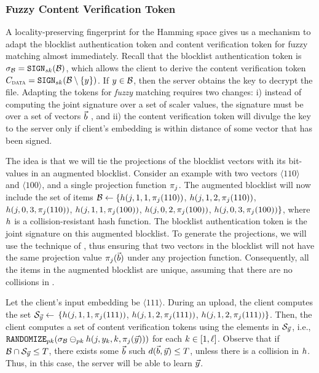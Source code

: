 \subsubsection{Fuzzy Content Verification Token}
\label{sec:fm:no_pre}
%
A locality-preserving fingerprint for the Hamming space gives us a mechanism to adapt the blocklist authentication token and content verification token for fuzzy matching almost immediately. Recall that the blocklist authentication token is $\genericSig[\blocklist] = \sign[\privKey](\blocklist)$, which allows the client to derive the content verification token $\contentToken{\clientData} = \sign[\privKey](\blocklist \setminus \{\genericCInputElmt\})$. If $\genericCInputElmt \in \blocklist$, then the server obtains the key to decrypt the file. Adapting the tokens for \emph{fuzzy} matching requires two changes: i) instead of computing the joint signature over a set of scaler values, the signature must be over a set of vectors $\blocklistVec$ , and ii) the content verification token will divulge the key to the server only if  client's embedding is within distance \threshold of some vector that has been signed. 



The idea is that we will tie the projections of the blocklist vectors with its bit-values in an augmented blocklist. Consider an example with two vectors $\langle 110 \rangle$ and $\langle 100 \rangle$, and a single projection function $\projFn[\projIdx]$. 
The augmented blocklist will now include the set of items $\blocklist \assign \{\hashFn(\projIdx, 1, 1, \projFn[\projIdx](110))$,
$\hashFn(\projIdx, 1, 2, \projFn[\projIdx](110))$,
$\hashFn(\projIdx, 0, 3,  \projFn[\projIdx](110))$,
$\hashFn(\projIdx, 1, 1, \projFn[\projIdx](100))$,
$\hashFn(\projIdx, 0, 2,  \projFn[\projIdx](100))$, 
$\hashFn(\projIdx, 0, 3, \projFn[\projIdx](100))\}$, where $\hashFn$ is a collision-resistant hash function. 
The blocklist authentication token is the joint signature on this augmented blocklist. To generate the projections, we will use the technique of \citet{chongchitmate2024approximate}, thus ensuring that two vectors in the blocklist will not have the same projection value $\projFn[\projIdx](\blocklistVec)$ under any projection function. Consequently, all the items in the augmented blocklist are unique, assuming that there are no collisions in \hashFn. 

Let the client's input embedding be $\langle 111 \rangle$. During an upload, the client computes the set  $\genericSetVar[\clientVec] \assign$ $\{\hashFn(\projIdx, 1, 1, 
\projFn[\projIdx](111))$, $\hashFn(\projIdx, 1, 2, 
\projFn[\projIdx](111))$, $\hashFn(\projIdx, 1, 2, 
\projFn[\projIdx](111))\}$. Then, the client computes a set of content verification tokens using the elements   
in $\genericSetVar[\clientVec]$, i.e.,  $\randomize[\pubKey](\genericSig[\blocklist] \sigMinus[\pubKey] \hashFn(\projIdx, \clientVec[\vecIdx], \vecIdx, \projFn[\projIdx](\clientVec)))$ for each $k \in [1, \ell]$. Observe that if $\blocklist \cap \genericSetVar[\clientVec] \le \threshold$, there exists some $\blocklistVec$ such $\hammingDist{\blocklistVec}{\clientVec} \le \threshold$, unless there is a collision in $\hashFn$. Thus, in this case, the server will be able to learn $\clientVec$. 

